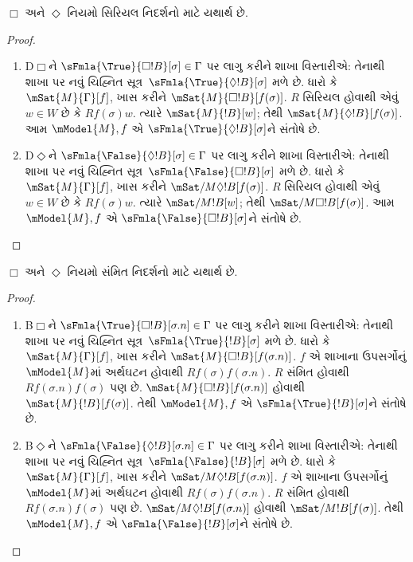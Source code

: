 \begin{prop}
  $\Box$%
   અને %
  $\Diamond$
  નિયમો
  સિરિયલ નિદર્શનો માટે યથાર્થ છે.
\end{prop}

\begin{proof}
\begin{enumerate}
\item D$\Box$ને
  $\sFmla{\True}{\Box !B}[\sigma] \in \Gamma$ પર લાગુ કરીને
  શાખા વિસ્તારીએ:
  તેનાથી શાખા પર નવું ચિહ્નિત સૂત્ર~$\sFmla{\True}{\Diamond !B}[\sigma]$ મળે છે.
    ધારો કે $\mSat{M}{\Gamma}[f]$, ખાસ કરીને
    $\mSat{M}{\Box !B}[f(\sigma)]$. $R$ સિરિયલ હોવાથી એવું
    $w \in W$ છે કે $Rf(\sigma)w$. ત્યારે $\mSat{M}{!B}[w]$;
    તેથી $\mSat{M}{\Diamond !B}[f(\sigma)]$.
    આમ $\mModel{M}, f$ એ
    $\sFmla{\True}{\Diamond!B}[\sigma]$ને સંતોષે છે.
\item D$\Diamond$ને
  $\sFmla{\False}{\Diamond !B}[\sigma] \in \Gamma$ પર લાગુ
  કરીને શાખા વિસ્તારીએ:
  તેનાથી શાખા પર નવું ચિહ્નિત સૂત્ર~$\sFmla{\False}{\Box !B}[\sigma]$ મળે છે.
    ધારો કે $\mSat{M}{\Gamma}[f]$, ખાસ કરીને
    $\mSat/{M}{\Diamond !B}[f(\sigma)]$. $R$ સિરિયલ હોવાથી
    એવું $w \in W$ છે કે $Rf(\sigma)w$. ત્યારે
    $\mSat/{M}{!B}[w]$; તેથી
    $\mSat/{M}{\Box !B}[f(\sigma)]$. આમ $\mModel{M}, f$ એ
    $\sFmla{\False}{\Box!B}[\sigma]$ને સંતોષે છે.
\end{enumerate}
\end{proof}



\begin{prop}
  $\Box$%
   અને %
  $\Diamond$
  નિયમો
  સંમિત નિદર્શનો માટે યથાર્થ છે.
\end{prop}

\begin{proof}
\begin{enumerate}
\item B$\Box$ને
  $\sFmla{\True}{\Box !B}[\sigma.n] \in \Gamma$ પર લાગુ કરીને
  શાખા વિસ્તારીએ:
  તેનાથી શાખા પર નવું ચિહ્નિત સૂત્ર~$\sFmla{\True}{!B}[\sigma]$ મળે છે. ધારો કે
    $\mSat{M}{\Gamma}[f]$, ખાસ કરીને $\mSat{M}{\Box
      !B}[f(\sigma.n)]$. $f$ એ શાખાના ઉપસર્ગોનું
    $\mModel{M}$માં અર્થઘટન હોવાથી $Rf(\sigma)f(\sigma.n)$.
    $R$ સંમિત હોવાથી $Rf(\sigma.n)f(\sigma)$ પણ છે.
    $\mSat{M}{\Box !B}[f(\sigma.n)]$ હોવાથી
    $\mSat{M}{!B}[f(\sigma)]$. તેથી $\mModel{M}, f$ એ
    $\sFmla{\True}{!B}[\sigma]$ને સંતોષે છે.
\item B$\Diamond$ને
  $\sFmla{\False}{\Diamond !B}[\sigma.n] \in \Gamma$ પર લાગુ
  કરીને શાખા વિસ્તારીએ:
  તેનાથી શાખા પર નવું ચિહ્નિત સૂત્ર~$\sFmla{\False}{!B}[\sigma]$ મળે છે. ધારો કે
    $\mSat{M}{\Gamma}[f]$, ખાસ કરીને $\mSat/{M}{\Diamond
      !B}[f(\sigma.n)]$. $f$ એ શાખાના ઉપસર્ગોનું
    $\mModel{M}$માં અર્થઘટન હોવાથી $Rf(\sigma)f(\sigma.n)$.
    $R$ સંમિત હોવાથી $Rf(\sigma.n)f(\sigma)$ પણ છે.
    $\mSat/{M}{\Diamond !B}[f(\sigma.n)]$ હોવાથી
    $\mSat/{M}{!B}[f(\sigma)]$. તેથી $\mModel{M}, f$ એ
    $\sFmla{\False}{!B}[\sigma]$ને સંતોષે છે.
\end{enumerate}
\end{proof}



